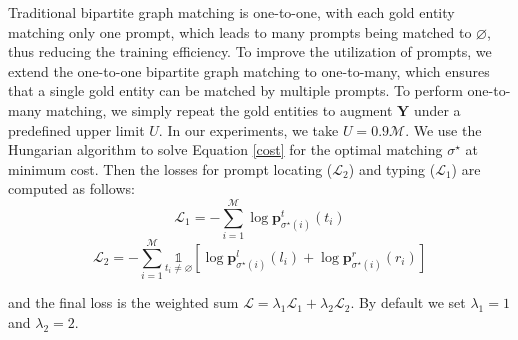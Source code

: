 \documentclass[11pt]{article}
\begin{document}
Traditional bipartite graph matching is one-to-one, with each gold entity matching only one prompt, which leads to many prompts being matched to $\varnothing$, thus reducing the training efficiency. To improve the utilization of prompts, we extend the one-to-one bipartite graph matching to one-to-many, which ensures that a single gold entity can be matched by multiple prompts. To perform one-to-many matching, we simply repeat the gold entities to augment $\mathbf{Y}$ under a predefined upper limit $U$. In our experiments, we take $U=0.9\mathcal{M}$.
We use the Hungarian algorithm \citep{kuhn1955hungarian} to solve Equation \ref{cost} for the optimal matching $\sigma^\star$ at minimum cost. Then the losses for prompt locating ($\mathcal{L}_2$) and typing ($\mathcal{L}_1$) are computed as follows:
\begin{equation*}
\mathcal{L}_{1} =-\sum_{i=1}^{\mathcal{M}}\log \mathbf{p}_{\sigma^{\star}(i)}^{t}\left(t_{i}\right)
\end{equation*}
\begin{equation*}
\mathcal{L}_{2} =-\sum_{i=1}^{\mathcal{M}}\underset{t_{i} \neq \varnothing}{\mathds{1}}{}\left[\log \mathbf{p}_{\sigma^{\star}(i)}^{l}\left(l_{i}\right)+\log \mathbf{p}_{\sigma^{\star}(i)}^{r}\left(r_{i}\right)\right]
\end{equation*}

\noindent and the final loss is the weighted sum $\mathcal{L} = \lambda_1\mathcal{L}_1+\lambda_2\mathcal{L}_2$. By default we set $\lambda_1 = 1 $ and $\lambda_2 =2$.
\end{document}
